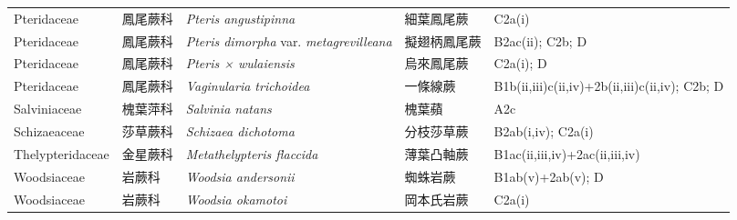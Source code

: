 {\begin{longtable}{p{2.5cm}p{2.5cm}p{4.5cm}p{2.5cm}p{3cm}}
    Pteridaceae & 鳳尾蕨科 & \textit{Pteris angustipinna}  & 細葉鳳尾蕨 & C2a(i) \index{Pteris@\textit{Pteris}!angustipinna@\textit{angustipinna}}  \index{細葉鳳尾蕨} \\
    Pteridaceae & 鳳尾蕨科 & \textit{Pteris dimorpha} var. \textit{metagrevilleana}  & 擬翅柄鳳尾蕨 & B2ac(ii); C2b; D \index{Pteris@\textit{Pteris}!dimorpha@\textit{dimorpha}!var. metagrevilleana@var. \textit{metagrevilleana}}  \index{擬翅柄鳳尾蕨} \\
    Pteridaceae & 鳳尾蕨科 & \textit{Pteris × wulaiensis}   & 烏來鳳尾蕨 & C2a(i); D \index{Pteris@\textit{Pteris}!×@\textit{×}!wulaiensis @wulaiensis \textit{}}  \index{烏來鳳尾蕨} \\
    Pteridaceae & 鳳尾蕨科 & \textit{Vaginularia trichoidea}  & 一條線蕨 & B1b(ii,iii)c(ii,iv)+2b(ii,iii)c(ii,iv); C2b; D \index{Vaginularia@\textit{Vaginularia}!trichoidea@\textit{trichoidea}}  \index{一條線蕨} \\
    Salviniaceae & 槐葉萍科 & \textit{Salvinia natans}  & 槐葉蘋 & A2c \index{Salvinia@\textit{Salvinia}!natans@\textit{natans}}  \index{槐葉蘋} \\
    Schizaeaceae & 莎草蕨科 & \textit{Schizaea dichotoma}  & 分枝莎草蕨 & B2ab(i,iv); C2a(i) \index{Schizaea@\textit{Schizaea}!dichotoma@\textit{dichotoma}}  \index{分枝莎草蕨} \\
    Thelypteridaceae & 金星蕨科 & \textit{Metathelypteris flaccida}  & 薄葉凸軸蕨 & B1ac(ii,iii,iv)+2ac(ii,iii,iv) \index{Metathelypteris@\textit{Metathelypteris}!flaccida@\textit{flaccida}}  \index{薄葉凸軸蕨} \\
    Woodsiaceae & 岩蕨科 & \textit{Woodsia andersonii}  & 蜘蛛岩蕨 & B1ab(v)+2ab(v); D \index{Woodsia@\textit{Woodsia}!andersonii@\textit{andersonii}}  \index{蜘蛛岩蕨} \\
    Woodsiaceae & 岩蕨科 & \textit{Woodsia okamotoi}  & 岡本氏岩蕨 & C2a(i) \index{Woodsia@\textit{Woodsia}!okamotoi@\textit{okamotoi}}  \index{岡本氏岩蕨} \\
    \bottomrule
        \end{longtable}
        }
    
